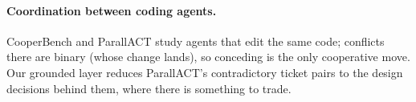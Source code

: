 \paragraph{Coordination between coding agents.} CooperBench \citep{cooperbench} and ParallACT \citep{parallact} study agents that edit the same code; conflicts there are binary (whose change lands), so conceding is the only cooperative move. Our grounded layer reduces ParallACT's contradictory ticket pairs to the design decisions behind them, where there is something to trade.


